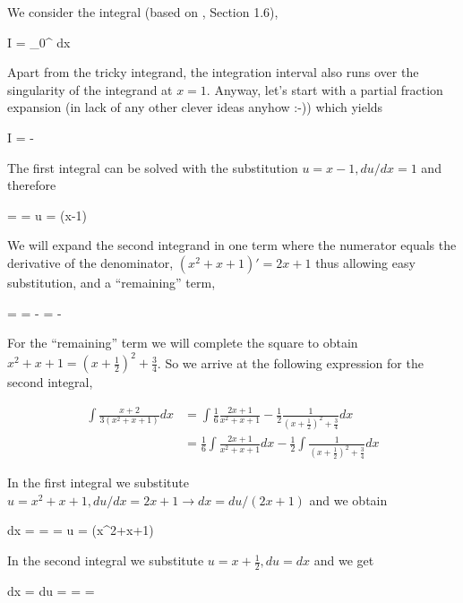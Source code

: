 
We consider the integral (based on \cite{nahin2020inside}, Section 1.6),

\bee
I = \int_0^\infty {} dx
\eee

Apart from the tricky integrand, the integration interval also runs over the singularity of the integrand at $x=1$. Anyway, let's start with a partial fraction expansion (in lack of any other clever ideas anyhow :-)) which yields

\bee
I = \int {} - 
\eee

The first integral can be solved with the substitution $u = x-1, du/dx = 1$ and therefore

\bee
\int{} =  \int {} =  \ln u =  \ln (x-1)
\eee

We will expand the second integrand in one term where the numerator equals the derivative of the denominator, $(x^2+x+1)' = 2x+1$ thus allowing easy substitution, and a ``remaining'' term,

\bee
{} =    =   -  =   - 
\eee

For the ``remaining'' term we will complete the square to obtain $x^2+x+1 = (x+\frac{1}{2})^2 + \frac{3}{4}$. So we arrive at the following expression for the second integral,

\begin{align*}
  \int \frac{x+2}{3(x^2+x+1)} dx &= \int \frac{1}{6} \frac{2x+1}{x^2+x+1} - \frac{1}{2}\frac{1}{(x+\frac{1}{2})^2 + \frac{3}{4}} dx\\
  &= \frac{1}{6} \int \frac{2x+1}{x^2+x+1} dx - \frac{1}{2} \int \frac{1}{(x+\frac{1}{2})^2 + \frac{3}{4}} dx
\end{align*}

In the first integral we substitute $u = x^2+x+1, du/dx = 2x+1 \rightarrow dx = du/(2x+1)$ and we obtain

\bee
{} \int {} dx =  \int {} =  \int {} =  \ln u =  \ln (x^2+x+1)
\eee

In the second integral we substitute $u = x + \frac{1}{2}, du=dx$ and we get

\bee
{} \int {} dx =  \int {} du =  \arctan {} =  \arctan {} =  \arctan {}
\eee

